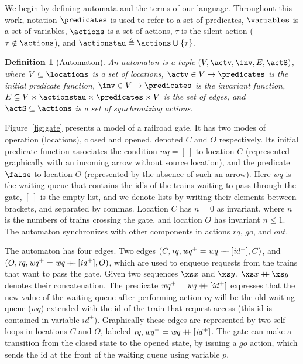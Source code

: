 \documentclass[submission,copyright,creativecommons,sharealike]{eptcs}
\renewcommand{\concat}{\ensuremath{+\hspace{-1.5ex}+\hspace{0.5ex}}}
\newtheorem{definition}{Definition}
\begin{document}
We begin by defining automata and the terms of our language.
Throughout this work, notation $\predicates$ is used to refer to a set
of predicates, $\variables$ is a set of variables, $\actions$ is a
set of actions, $\tau$ is the silent action ($\tau \notin \actions$),
and $\actionstau \triangleq \actions \cup \{\tau\}$.

\begin{definition}[Automaton]
  An automaton is a tuple $(V, \actv, \inv, E, \actS)$, where $V
  \subseteq \locations$ is a set of locations, $\actv \in V
  \rightarrow \predicates$ is the initial predicate function, $\inv
  \in V \rightarrow \predicates$ is the invariant function, $E
  \subseteq V \times \actionstau \times \predicates \times V$ is the
  set of edges, and  $\actS \subseteq \actions$ is a set of
    synchronizing actions.
\end{definition}

Figure~\ref{fig:gate} presents a model of a railroad gate.
It has two modes of operation (locations), closed and opened, denoted
$C$ and $O$ respectively.
Its initial predicate function associates the condition $\mathit{wq} =
[\ ]$ to location $C$ (represented graphically with an incoming arrow
without source location), and the predicate $\false$ to location $O$
(represented by the absence of such an arrow). Here $\mathit{wq}$ is
the waiting queue that contains the id's of the trains waiting to pass
through the gate, $[\ ]$ is the empty list, and we denote lists
by writing their elements between brackets, and separated by commas.
Location $C$ has $n=0$ as invariant, where $n$ is the numbers of
trains crossing the gate, and location $O$ has invariant $n \leq 1$.
The automaton synchronizes with other components in actions
$\mathit{rq}$, $\mathit{go}$, and $\mathit{out}$.

The automaton has four edges. Two edges $(C, \mathit{rq},
\mathit{wq}^+ = \mathit{wq} \concat [\mathit{id^+}], C)$, and $(O,
\mathit{rq}, \mathit{wq}^+ = \mathit{wq} \concat [\mathit{id^+}], O)$,
which are used to enqueue requests from the trains that want to pass
the gate. Given two sequences $\xs x$ and $\xs y$, $\xs x \concat \xs
y$ denotes their concatenation. The predicate $\mathit{wq}^+ = \mathit{wq}
\concat [\mathit{id^+}]$ expresses that the new value of the waiting queue after
performing action $\mathit{rq}$ will be the old waiting queue
($\mathit{wq}$) extended with the id of the train that request access
(this id is contained in variable $id^+$). Graphically these edges are
represented by two self loops in locations $C$ and $O$, labeled
$\mathit{rq}, \mathit{wq}^+ = \mathit{wq} \concat [\mathit{id^+}]$.
The gate can make a transition from the closed state to the opened
state, by issuing a $\mathit{go}$ action, which sends the id at the
front of the waiting queue using variable $p$.
\end{document}
